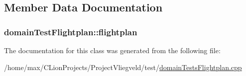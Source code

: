 \subsection{Member Data Documentation}
\subsubsection[{\texorpdfstring{flightplan}{flightplan}}]{ domain\+Test\+Flightplan\+::flightplan\hspace{0.3cm}{\ttfamily [protected]}}\hypertarget{classdomainTestFlightplan_a5c1212bcf010e1a67e7f4524518e0ae3}{}\label{classdomainTestFlightplan_a5c1212bcf010e1a67e7f4524518e0ae3}


The documentation for this class was generated from the following file\+:\begin{DoxyCompactItemize}
\item 
/home/max/\+C\+Lion\+Projects/\+Project\+Vliegveld/test/\hyperlink{domainTestsFlightplan_8cpp}{domain\+Tests\+Flightplan.\+cpp}\end{DoxyCompactItemize}
